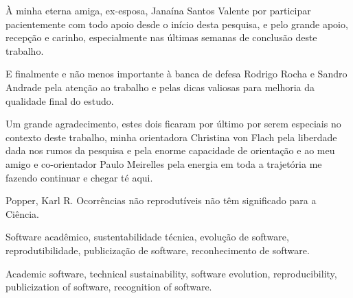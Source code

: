 \documentclass[msc, classic, a4paper]{ufbathesis}
\begin{document}
À minha eterna amiga, ex-esposa, Janaína Santos Valente por participar pacientemente
com todo apoio desde o início desta pesquisa, e pelo grande apoio, recepção e
carinho, especialmente nas últimas semanas de conclusão deste trabalho.

E finalmente e não menos importante à banca de defesa Rodrigo Rocha e Sandro
Andrade pela atenção ao trabalho e pelas dicas valiosas para melhoria da
qualidade final do estudo.

Um grande agradecimento, estes dois ficaram por último por serem especiais no
contexto deste trabalho, minha orientadora Christina von Flach pela liberdade
dada nos rumos da pesquisa e pela enorme capacidade de orientação e ao meu
amigo e co-orientador Paulo Meirelles pela energia em toda a trajetória me
fazendo continuar e chegar té aqui.

\begin{epigraph}[1959]{Popper, Karl R.}
Ocorrências não reprodutíveis não têm significado para a Ciência.
\end{epigraph}

\resumo



\begin{keywords}
Software acadêmico, sustentabilidade técnica, evolução de software,
reprodutibilidade, publicização de software, reconhecimento de software.
\end{keywords}

\abstract



\begin{keywords}
Academic software, technical sustainability, software evolution,
reproducibility, publicization of software, recognition of software.
\end{keywords}

\tableofcontents
\listoffigures
\listoftables
\mainmatter









\end{document}
